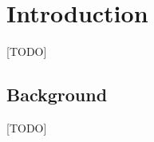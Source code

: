 \chapter{Introduction} \label{ch:introduction}
% 
% 
% 


[TODO]

\section{Background}
\label{sec:background}
[TODO]

